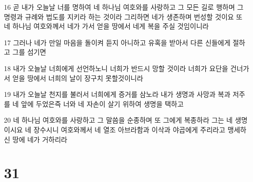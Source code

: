 \par 16 곧 내가 오늘날 너를 명하여 네 하나님 여호와를 사랑하고 그 모든 길로 행하며 그 명령과 규례와 법도를 지키라 하는 것이라 그리하면 네가 생존하며 번성할 것이요 또 네 하나님 여호와께서 네가 가서 얻을 땅에서 네게 복을 주실 것임이니라
\par 17 그러나 네가 만일 마음을 돌이켜 듣지 아니하고 유혹을 받아서 다른 신들에게 절하고 그를 섬기면
\par 18 내가 오늘날 너희에게 선언하노니 너희가 반드시 망할 것이라 너희가 요단을 건너가서 얻을 땅에서 너희의 날이 장구치 못할것이니라
\par 19 내가 오늘날 천지를 불러서 너희에게 증거를 삼노라 내가 생명과 사망과 복과 저주를 네 앞에 두었은즉 너와 네 자손이 살기 위하여 생명을 택하고
\par 20 네 하나님 여호와를 사랑하고 그 말씀을 순종하며 또 그에게 복종하라 그는 네 생명이시요 네 장수시니 여호와께서 네 열조 아브라함과 이삭과 야곱에게 주리라고 맹세하신 땅에 네가 거하리라

\chapter{31}

